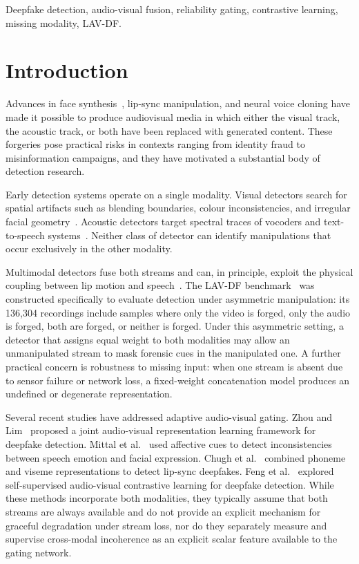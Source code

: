 \documentclass[conference]{IEEEtran}
\begin{document}
\begin{IEEEkeywords}
Deepfake detection, audio-visual fusion, reliability gating, contrastive learning, missing modality, LAV-DF.
\end{IEEEkeywords}

\section{Introduction}

Advances in face synthesis~\cite{rossler2019faceforensics}, lip-sync manipulation, and neural voice cloning have made it possible to produce audiovisual media in which either the visual track, the acoustic track, or both have been replaced with generated content. These forgeries pose practical risks in contexts ranging from identity fraud to misinformation campaigns, and they have motivated a substantial body of detection research.

Early detection systems operate on a single modality. Visual detectors search for spatial artifacts such as blending boundaries, colour inconsistencies, and irregular facial geometry~\cite{rossler2019faceforensics}. Acoustic detectors target spectral traces of vocoders and text-to-speech systems~\cite{korshunov2018deepfakes}. Neither class of detector can identify manipulations that occur exclusively in the other modality.

Multimodal detectors fuse both streams and can, in principle, exploit the physical coupling between lip motion and speech~\cite{haliassos2021lips}. The LAV-DF benchmark~\cite{cai2022lavdf} was constructed specifically to evaluate detection under asymmetric manipulation: its 136{,}304 recordings include samples where only the video is forged, only the audio is forged, both are forged, or neither is forged. Under this asymmetric setting, a detector that assigns equal weight to both modalities may allow an unmanipulated stream to mask forensic cues in the manipulated one. A further practical concern is robustness to missing input: when one stream is absent due to sensor failure or network loss, a fixed-weight concatenation model produces an undefined or degenerate representation.

Several recent studies have addressed adaptive audio-visual gating. Zhou and Lim~\cite{zhou2021joint} proposed a joint audio-visual representation learning framework for deepfake detection. Mittal et al.~\cite{mittal2020emotions} used affective cues to detect inconsistencies between speech emotion and facial expression. Chugh et al.~\cite{chugh2020not} combined phoneme and viseme representations to detect lip-sync deepfakes. Feng et al.~\cite{feng2023selfsuper} explored self-supervised audio-visual contrastive learning for deepfake detection. While these methods incorporate both modalities, they typically assume that both streams are always available and do not provide an explicit mechanism for graceful degradation under stream loss, nor do they separately measure and supervise cross-modal incoherence as an explicit scalar feature available to the gating network.
\end{document}
